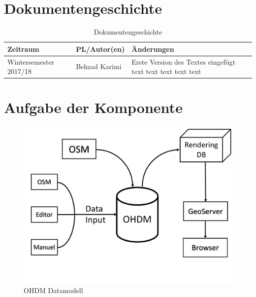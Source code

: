 \section{Dokumentengeschichte}
\begin{table}[h]
 \begin{tabular}{|l|l|p{4cm}|}
 \hline
 Zeitraum & PL/Autor(en) & Änderungen \\
 \hline
 Wintersemester 2017/18 & Behzad Karimi & 
Erste Version des Textes eingefügt\newline 
text \newline 
text \newline 
text \newline 
text \newline 
text \newline 
 
  \\
 \hline
 \end{tabular}
 \caption{Dokumentengeschichte}
 \end{table}

\section{Aufgabe der Komponente}
\begin{figure}[h!]
\centering
\includegraphics[page=1, width=127mm]{ohdm_datenmodell/Bilder/data.pdf}
\caption{OHDM Datamodell}
\label{fig:datamodell}
\end{figure}

